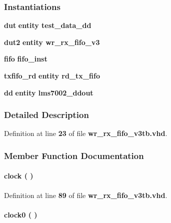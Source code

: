 \subsubsection*{Instantiations}
 \begin{DoxyCompactItemize}
\item 
{\bf dut}  {\bfseries entity test\+\_\+data\+\_\+dd}   
\item 
{\bf dut2}  {\bfseries entity wr\+\_\+rx\+\_\+fifo\+\_\+v3}   
\item 
{\bf fifo}  {\bfseries fifo\+\_\+inst}   
\item 
{\bf txfifo\+\_\+rd}  {\bfseries entity rd\+\_\+tx\+\_\+fifo}   
\item 
{\bf dd}  {\bfseries entity lms7002\+\_\+ddout}   
\end{DoxyCompactItemize}


\subsubsection{Detailed Description}


Definition at line {\bf 23} of file {\bf wr\+\_\+rx\+\_\+fifo\+\_\+v3tb.\+vhd}.



\subsubsection{Member Function Documentation}
\paragraph[{clock}]{\setlength{\rightskip}{0pt plus 5cm} {\bfseries \textcolor{vhdlchar}{ }} clock ( ) \hspace{0.3cm}{\ttfamily [Process]}}\label{classwr__rx__fifo__v3tb_1_1tb__behave_af761a67e9d7ce9e23381088b6f2ae893}


Definition at line {\bf 89} of file {\bf wr\+\_\+rx\+\_\+fifo\+\_\+v3tb.\+vhd}.

\paragraph[{clock0}]{\setlength{\rightskip}{0pt plus 5cm} {\bfseries \textcolor{vhdlchar}{ }} clock0 ( ) \hspace{0.3cm}{\ttfamily [Process]}}\label{classwr__rx__fifo__v3tb_1_1tb__behave_a0ffcf9b3fa89917ed2b73a96f170b7ae}


